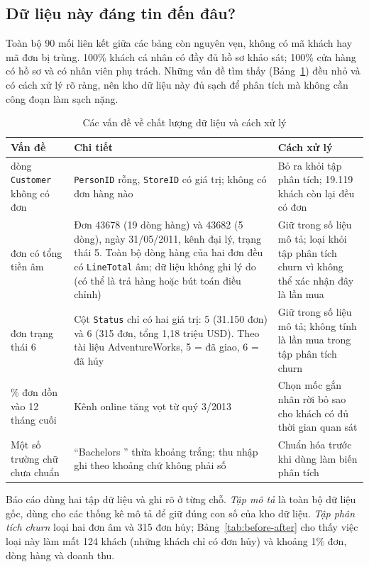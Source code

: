\subsection{Dữ liệu này đáng tin đến đâu?}
Toàn bộ 90 mối liên kết giữa các bảng còn nguyên vẹn, không có mã khách hay mã đơn bị trùng. 100\% khách cá nhân có đầy đủ hồ sơ khảo sát; 100\% cửa hàng có hồ sơ và có nhân viên phụ trách. Những vấn đề tìm thấy (Bảng~\ref{tab:quality}) đều nhỏ và có cách xử lý rõ ràng, nên kho dữ liệu này đủ sạch để phân tích mà không cần công đoạn làm sạch nặng.

\begin{table}[H]
\centering
\caption{Các vấn đề về chất lượng dữ liệu và cách xử lý}
\label{tab:quality}
\small
\begin{tabularx}{\textwidth}{>{\raggedright\arraybackslash}p{3.4cm} X >{\raggedright\arraybackslash}p{3.8cm}}
\toprule
\rowcolor{tblhead} \textbf{Vấn đề} & \textbf{Chi tiết} & \textbf{Cách xử lý} \\
\midrule
701 dòng \texttt{Customer} không có đơn & \texttt{PersonID} rỗng, \texttt{StoreID} có giá trị; không có đơn hàng nào & Bỏ ra khỏi tập phân tích; 19.119 khách còn lại đều có đơn \\
2 đơn có tổng tiền âm & Đơn 43678 (19 dòng hàng) và 43682 (5 dòng), ngày 31/05/2011, kênh đại lý, trạng thái 5. Toàn bộ dòng hàng của hai đơn đều có \texttt{LineTotal} âm; dữ liệu không ghi lý do (có thể là trả hàng hoặc bút toán điều chỉnh) & Giữ trong số liệu mô tả; loại khỏi tập phân tích churn vì không thể xác nhận đây là lần mua \\
315 đơn trạng thái 6 & Cột \texttt{Status} chỉ có hai giá trị: 5 (31.150 đơn) và 6 (315 đơn, tổng 1,18 triệu USD). Theo tài liệu AdventureWorks, 5 = đã giao, 6 = đã hủy & Giữ trong số liệu mô tả; không tính là lần mua trong tập phân tích churn \\
76\% đơn dồn vào 12 tháng cuối & Kênh online tăng vọt từ quý 3/2013 & Chọn mốc gắn nhãn rời bỏ sao cho khách có đủ thời gian quan sát \\
Một số trường chữ chưa chuẩn & ``Bachelors '' thừa khoảng trắng; thu nhập ghi theo khoảng chứ không phải số & Chuẩn hóa trước khi dùng làm biến phân tích \\
\bottomrule
\end{tabularx}
\end{table}

Báo cáo dùng hai tập dữ liệu và ghi rõ ở từng chỗ. \emph{Tập mô tả} là toàn bộ dữ liệu gốc, dùng cho các thống kê mô tả để giữ đúng con số của kho dữ liệu. \emph{Tập phân tích churn} loại hai đơn âm và 315 đơn hủy; Bảng~\ref{tab:before-after} cho thấy việc loại này làm mất 124 khách (những khách chỉ có đơn hủy) và khoảng 1\% đơn, dòng hàng và doanh thu.

